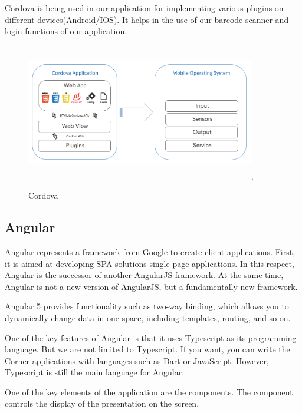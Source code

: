 \documentclass[12pt,a4paper,oneside,openany]{book}
\begin{document}
Cordova is being used in our application for implementing various plugins on different devices(Android/IOS). It helps in the use of our barcode scanner and login functions of our application.\cite{Cordova}

\begin{figure}[ht]
\renewcommand\thefigure{4.3}
\centering
\includegraphics[width=10cm, height=6cm]{Images/cordova.png},
\caption{Cordova}
\label{Cordova}
\end{figure}

\subsection{Angular}
Angular represents a framework from Google to create client applications. First, it is aimed at developing SPA-solutions single-page applications. In this respect, Angular is the successor of another AngularJS framework. At the same time, Angular is not a new version of AngularJS, but a fundamentally new framework.

Angular 5 provides functionality such as two-way binding, which allows you to dynamically change data in one space, including templates, routing, and so on.

One of the key features of Angular is that it uses Typescript as its programming language. But we are not limited to Typescript. If you want, you can write the Corner applications with languages such as Dart or JavaScript. However, Typescript is still the main language for Angular.

One of the key elements of the application are the components. The component controls the display of the presentation on the screen. \cite{angular} \\
\end{document}
